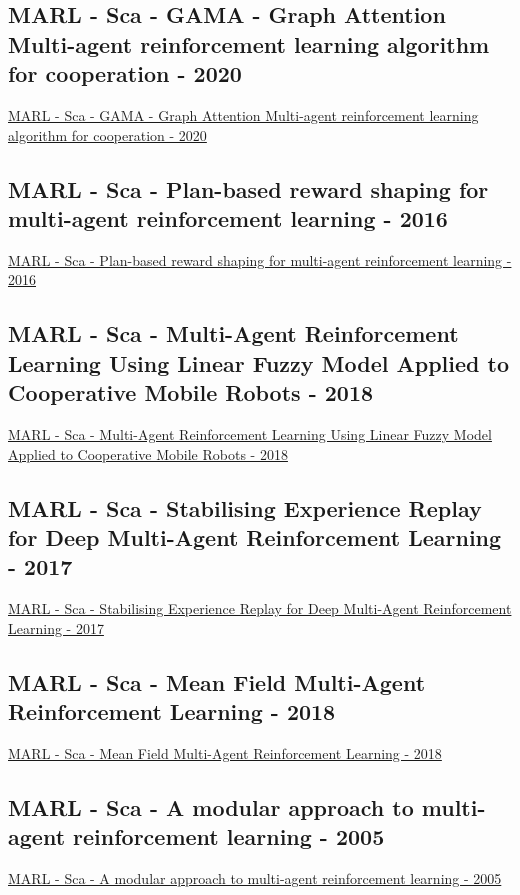 \subsection{MARL - Sca - GAMA - Graph Attention Multi-agent reinforcement learning algorithm for cooperation - 2020}
\href{https://link.springer.com/article/10.1007/s10489-020-01755-8}{MARL - Sca - GAMA - Graph Attention Multi-agent reinforcement learning algorithm for cooperation - 2020}

\subsection{MARL - Sca - Plan-based reward shaping for multi-agent reinforcement learning - 2016}
\href{https://www.cambridge.org/core/journals/knowledge-engineering-review/article/planbased-reward-shaping-for-multiagent-reinforcement-learning/B173D25B1006B755667616C3A3EB3BE5}{MARL - Sca - Plan-based reward shaping for multi-agent reinforcement learning - 2016}

\subsection{MARL - Sca - Multi-Agent Reinforcement Learning Using Linear Fuzzy Model Applied to Cooperative Mobile Robots - 2018}
\href{https://www.mdpi.com/2073-8994/10/10/461}{MARL - Sca - Multi-Agent Reinforcement Learning Using Linear Fuzzy Model Applied to Cooperative Mobile Robots - 2018}

\subsection{MARL - Sca - Stabilising Experience Replay for Deep Multi-Agent Reinforcement Learning - 2017}
\href{http://proceedings.mlr.press/v70/foerster17b.html}{MARL - Sca - Stabilising Experience Replay for Deep Multi-Agent Reinforcement Learning - 2017}

\subsection{MARL - Sca - Mean Field Multi-Agent Reinforcement Learning - 2018}
\href{http://proceedings.mlr.press/v80/yang18d.html}{MARL - Sca - Mean Field Multi-Agent Reinforcement Learning - 2018}

\subsection{MARL - Sca - A modular approach to multi-agent reinforcement learning - 2005}
\href{https://link.springer.com/chapter/10.1007/3-540-62934-3_39}{MARL - Sca - A modular approach to multi-agent reinforcement learning - 2005}

